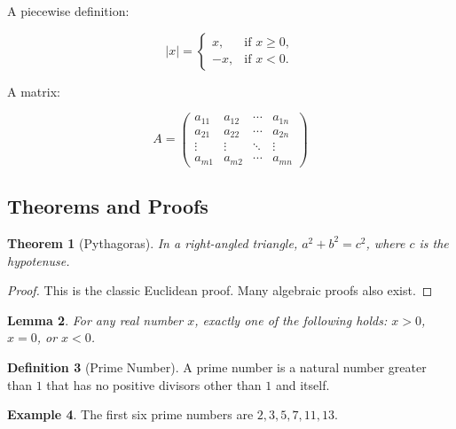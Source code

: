 \documentclass[11pt]{article}
\theoremstyle{definition}
\newtheorem{definition}{Definition}[section]
\newtheorem{example}[definition]{Example}
\theoremstyle{plain}
\newtheorem{theorem}[definition]{Theorem}
\newtheorem{lemma}[definition]{Lemma}
\begin{document}
A piecewise definition:

\begin{equation}
    \label{eq:piecewise}
    |x| =
    \begin{cases}
        x,  & \text{if } x \ge 0, \\
        -x, & \text{if } x < 0.
    \end{cases}
\end{equation}

A matrix:

\begin{equation}
    \label{eq:matrix}
    A =
    \begin{pmatrix}
        a_{11} & a_{12} & \cdots & a_{1n} \\
        a_{21} & a_{22} & \cdots & a_{2n} \\
        \vdots & \vdots & \ddots & \vdots \\
        a_{m1} & a_{m2} & \cdots & a_{mn}
    \end{pmatrix}
\end{equation}

\subsection{Theorems and Proofs}
\label{sec:math:theorems}

\begin{theorem}[Pythagoras]
    \label{thm:pythagoras}
    In a right-angled triangle, $a^2 + b^2 = c^2$, where $c$ is the
    hypotenuse.
\end{theorem}

\begin{proof}
    This is the classic Euclidean proof.
    Many algebraic proofs also exist.
\end{proof}

\begin{lemma}
    \label{lem:trichotomy}
    For any real number $x$, exactly one of the following holds:
    $x > 0$, $x = 0$, or $x < 0$.
\end{lemma}

\begin{definition}[Prime Number]
    \label{def:prime}
    A prime number is a natural number greater than $1$ that has no
    positive divisors other than $1$ and itself.
\end{definition}

\begin{example}
    \label{ex:primes}
    The first six prime numbers are $2, 3, 5, 7, 11, 13$.
\end{example}
\end{document}
